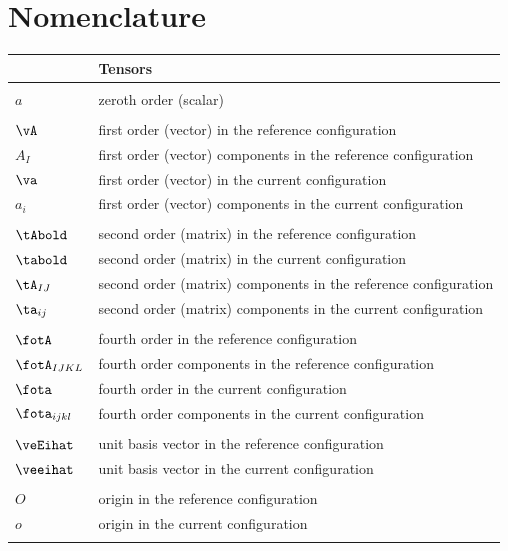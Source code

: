 \chapter{Nomenclature}

\noindent \begin{tabular}{ll} \hline
 & {\bf Tensors} \\ \hline 
\hspace{0.2\textwidth} & \hspace{0.745\textwidth} \\
$a$ &
zeroth order (scalar)
\\
& \\
$\vA$ & 
first order (vector) in the reference configuration
\\
$A_I$ & 
first order (vector) components in the reference configuration
\\
$\va$ &
first order (vector) in the current configuration
\\
$a_i$ &
first order (vector) components in the current configuration
\\
& \\
$\tAbold$ &
second order (matrix) in the reference configuration
\\
$\tabold$ & 
second order (matrix) in the current configuration
\\
$\tA_{IJ}$ &
second order (matrix) components in the reference configuration
\\
$\ta_{ij}$ & 
second order (matrix) components in the current configuration
\\
& \\
$\fotA$ &
fourth order in the reference configuration
\\
$\fotA_{IJKL}$ &
fourth order components in the reference configuration
\\
$\fota$ & 
fourth order in the current configuration
\\
$\fota_{ijkl}$ & 
fourth order components in the current configuration
\\
& \\
$\veEihat$ &
unit basis vector in the reference configuration
\\
$\veeihat$ &
unit basis vector in the current configuration
\\ 
& \\
$O$ & 
origin in the reference configuration
\\
$o$ & 
origin in the current configuration
\\
& \\ \end{tabular}

